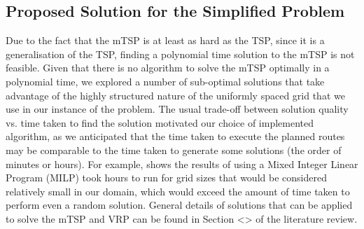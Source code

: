 \subsection{Proposed Solution for the Simplified Problem}
Due to the fact that the mTSP is at least as hard as the TSP, since it is a generalisation of the TSP, finding a polynomial time solution to the mTSP is not feasible. Given that there is no algorithm to solve the mTSP optimally in a polynomial time, we explored a number of sub-optimal solutions that take advantage of the highly structured nature of the uniformly spaced grid that we use in our instance of the problem. The usual trade-off between solution quality vs. time taken to find the solution motivated our choice of implemented algorithm, as we anticipated that the time taken to execute the planned routes may be comparable to the time taken to generate some solutions (the order of minutes or hours). For example, \cite{Hungerlander2018TheGrids} shows the results of using a Mixed Integer Linear Program (MILP) took hours to run for grid sizes that would be considered relatively small in our domain, which would exceed the amount of time taken to perform even a random solution. General details of solutions that can be applied to solve the mTSP and VRP can be found in Section <> of the literature review.

